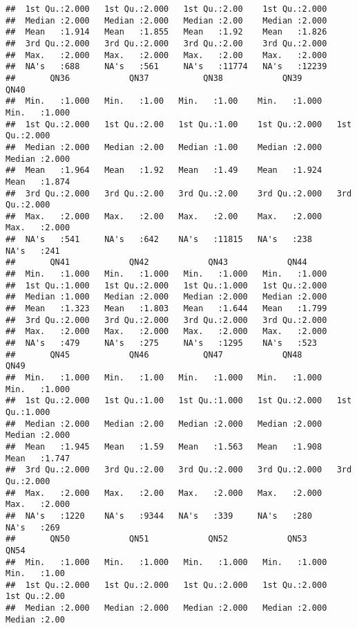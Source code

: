 \documentclass[
]{article}
\begin{document}
\begin{verbatim}
##  1st Qu.:2.000   1st Qu.:2.000   1st Qu.:2.00    1st Qu.:2.000  
##  Median :2.000   Median :2.000   Median :2.00    Median :2.000  
##  Mean   :1.914   Mean   :1.855   Mean   :1.92    Mean   :1.826  
##  3rd Qu.:2.000   3rd Qu.:2.000   3rd Qu.:2.00    3rd Qu.:2.000  
##  Max.   :2.000   Max.   :2.000   Max.   :2.00    Max.   :2.000  
##  NA's   :688     NA's   :561     NA's   :11774   NA's   :12239  
##       QN36            QN37           QN38            QN39            QN40      
##  Min.   :1.000   Min.   :1.00   Min.   :1.00    Min.   :1.000   Min.   :1.000  
##  1st Qu.:2.000   1st Qu.:2.00   1st Qu.:1.00    1st Qu.:2.000   1st Qu.:2.000  
##  Median :2.000   Median :2.00   Median :1.00    Median :2.000   Median :2.000  
##  Mean   :1.964   Mean   :1.92   Mean   :1.49    Mean   :1.924   Mean   :1.874  
##  3rd Qu.:2.000   3rd Qu.:2.00   3rd Qu.:2.00    3rd Qu.:2.000   3rd Qu.:2.000  
##  Max.   :2.000   Max.   :2.00   Max.   :2.00    Max.   :2.000   Max.   :2.000  
##  NA's   :541     NA's   :642    NA's   :11815   NA's   :238     NA's   :241    
##       QN41            QN42            QN43            QN44      
##  Min.   :1.000   Min.   :1.000   Min.   :1.000   Min.   :1.000  
##  1st Qu.:1.000   1st Qu.:2.000   1st Qu.:1.000   1st Qu.:2.000  
##  Median :1.000   Median :2.000   Median :2.000   Median :2.000  
##  Mean   :1.323   Mean   :1.803   Mean   :1.644   Mean   :1.799  
##  3rd Qu.:2.000   3rd Qu.:2.000   3rd Qu.:2.000   3rd Qu.:2.000  
##  Max.   :2.000   Max.   :2.000   Max.   :2.000   Max.   :2.000  
##  NA's   :479     NA's   :275     NA's   :1295    NA's   :523    
##       QN45            QN46           QN47            QN48            QN49      
##  Min.   :1.000   Min.   :1.00   Min.   :1.000   Min.   :1.000   Min.   :1.000  
##  1st Qu.:2.000   1st Qu.:1.00   1st Qu.:1.000   1st Qu.:2.000   1st Qu.:1.000  
##  Median :2.000   Median :2.00   Median :2.000   Median :2.000   Median :2.000  
##  Mean   :1.945   Mean   :1.59   Mean   :1.563   Mean   :1.908   Mean   :1.747  
##  3rd Qu.:2.000   3rd Qu.:2.00   3rd Qu.:2.000   3rd Qu.:2.000   3rd Qu.:2.000  
##  Max.   :2.000   Max.   :2.00   Max.   :2.000   Max.   :2.000   Max.   :2.000  
##  NA's   :1220    NA's   :9344   NA's   :339     NA's   :280     NA's   :269    
##       QN50            QN51            QN52            QN53            QN54     
##  Min.   :1.000   Min.   :1.000   Min.   :1.000   Min.   :1.000   Min.   :1.00  
##  1st Qu.:2.000   1st Qu.:2.000   1st Qu.:2.000   1st Qu.:2.000   1st Qu.:2.00  
##  Median :2.000   Median :2.000   Median :2.000   Median :2.000   Median :2.00  

\end{verbatim}
\end{document}

